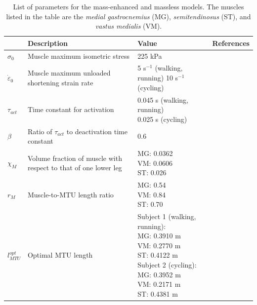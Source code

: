 \documentclass{sfuthesis}
\numberwithin{equation}{section}
\numberwithin{figure}{chapter}
\numberwithin{table}{chapter}
\theoremstyle{definition}
\newcommand{\depsilon}{\dot{\varepsilon}}
\begin{document}
\begin{table}
    \centering
    \begin{tabular}{|lp{5cm}|l|l|}\hline
         & Description & Value & References \\\hline
        $\sigma_0$ & Muscle maximum isometric stress & 225 kPa & \cite{Medler2002, Powell1984}\\\hline
        $\depsilon_0$ & Muscle maximum unloaded shortening strain rate & \makecell[l]{5 s$^{-1}$ (walking, running) \\ 10 s$^{-1}$ (cycling)} & \cite{WakeingLee2012} \\\hline
        $\tau_{act}$ & Time constant for activation & \makecell[l]{0.045 s (walking, running) \\ 0.025 s (cycling)} & \cite{Dick2017} \\\hline
        $\beta$ & Ratio of $\tau_{act}$ to deactivation time constant & 0.6 &\cite{Dick2017} \\\hline
        $\chi_M$ & Volume fraction of muscle with respect to that of one lower leg & \makecell[l]{MG: 0.0362 \\ VM: 0.0606 \\ ST: 0.026} & \cite{Hansfield2014} \\\hline
        $r_M$ & Muscle-to-MTU length ratio & \makecell[l]{MG: 0.54 \\ VM: 0.84 \\ ST: 0.70 } & \cite{Kovacz2020,OBrien2010}\\\hline
        $l_{MTU}^{opt}$ & Optimal MTU length & \makecell[l]{Subject 1 (walking, running):\\ \hspace{1em} MG: 0.3910 m \\ \hspace{1em} VM: 0.2770 m \\ \hspace{1em} ST: 0.4122 m \\ Subject 2 (cycling):\\ \hspace{1em} MG: 0.3952 m \\ \hspace{1em} VM: 0.2171 m \\ \hspace{1em} ST: 0.4381 m} & \cite{EvanThesis} \\\hline
    \end{tabular}
    \caption{List of parameters for the mass-enhanced and massless models. The muscles listed in the table are the \textit{medial gastrocnemius} (MG), \textit{semitendinosus} (ST), and \textit{vastus medialis} (VM).}
    \label{tab:1d-parameters}
\end{table}
\end{document}
